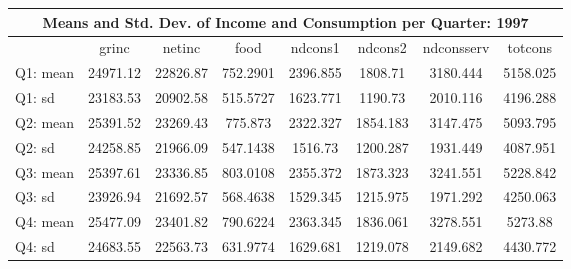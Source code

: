 \begin{tabular}{l*{7}{c}}
\hline\hline
\multicolumn{8}{c}{Means and Std. Dev. of Income and Consumption per Quarter: 1997}  \\
\hline    
            &       grinc&      netinc&        food&     ndcons1&     ndcons2&  ndconsserv&     totcons\\
\hline
Q1: mean     &    24971.12&    22826.87&    752.2901&    2396.855&     1808.71&    3180.444&    5158.025\\
Q1: sd     &    23183.53&    20902.58&    515.5727&    1623.771&     1190.73&    2010.116&    4196.288\\
Q2: mean     &    25391.52&    23269.43&     775.873&    2322.327&    1854.183&    3147.475&    5093.795\\
Q2: sd    &    24258.85&    21966.09&    547.1438&     1516.73&    1200.287&    1931.449&    4087.951\\
Q3: mean    &    25397.61&    23336.85&    803.0108&    2355.372&    1873.323&    3241.551&    5228.842\\
Q3: sd   &    23926.94&    21692.57&    568.4638&    1529.345&    1215.975&    1971.292&    4250.063\\
Q4: mean    &    25477.09&    23401.82&    790.6224&    2363.345&    1836.061&    3278.551&     5273.88\\
Q4: sd   &    24683.55&    22563.73&    631.9774&    1629.681&    1219.078&    2149.682&    4430.772\\
\hline\hline
\end{tabular}
